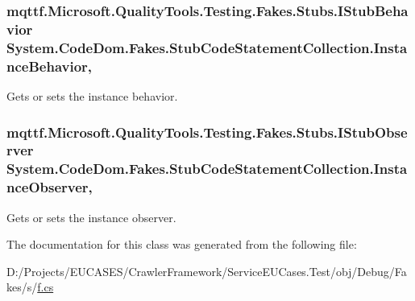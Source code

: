 \hypertarget{class_system_1_1_code_dom_1_1_fakes_1_1_stub_code_statement_collection_ab14fb82ca1abcebc163e202a0f1d6070}{
\subsubsection[{Instance\-Behavior}]{\setlength{\rightskip}{0pt plus 5cm}mqttf.\-Microsoft.\-Quality\-Tools.\-Testing.\-Fakes.\-Stubs.\-I\-Stub\-Behavior System.\-Code\-Dom.\-Fakes.\-Stub\-Code\-Statement\-Collection.\-Instance\-Behavior\hspace{0.3cm}{\ttfamily [get]}, {\ttfamily [set]}}}\label{class_system_1_1_code_dom_1_1_fakes_1_1_stub_code_statement_collection_ab14fb82ca1abcebc163e202a0f1d6070}


Gets or sets the instance behavior.

\hypertarget{class_system_1_1_code_dom_1_1_fakes_1_1_stub_code_statement_collection_a4b65c9d776ad9a495c9644a56c866442}{
\subsubsection[{Instance\-Observer}]{\setlength{\rightskip}{0pt plus 5cm}mqttf.\-Microsoft.\-Quality\-Tools.\-Testing.\-Fakes.\-Stubs.\-I\-Stub\-Observer System.\-Code\-Dom.\-Fakes.\-Stub\-Code\-Statement\-Collection.\-Instance\-Observer\hspace{0.3cm}{\ttfamily [get]}, {\ttfamily [set]}}}\label{class_system_1_1_code_dom_1_1_fakes_1_1_stub_code_statement_collection_a4b65c9d776ad9a495c9644a56c866442}


Gets or sets the instance observer.



The documentation for this class was generated from the following file\-:\begin{DoxyCompactItemize}
\item 
D\-:/\-Projects/\-E\-U\-C\-A\-S\-E\-S/\-Crawler\-Framework/\-Service\-E\-U\-Cases.\-Test/obj/\-Debug/\-Fakes/s/\hyperlink{s_2f_8cs}{f.\-cs}\end{DoxyCompactItemize}
